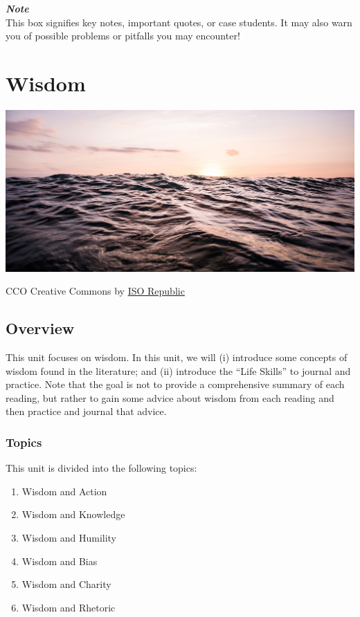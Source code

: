 \documentclass[
]{book}
\providecommand{\tightlist}{%
  \setlength{\itemsep}{0pt}\setlength{\parskip}{0pt}}
\begin{document}
\begin{feedback}
\textbf{\emph{Note}}\\
This box signifies key notes, important quotes, or case students. It may
also warn you of possible problems or pitfalls you may encounter!
\end{feedback}

\hypertarget{wisdom}{%
\chapter{Wisdom}\label{wisdom}}

\includegraphics{assets/u1/Unit_1_Overview.png}

CCO Creative Commons by \href{https://isorepublic.com/photo/sun-reflecting-on-waves/}{ISO Republic}

\hypertarget{overview}{%
\section*{Overview}\label{overview}}

This unit focuses on wisdom. In this unit, we will (i) introduce some concepts of wisdom found in the literature; and (ii) introduce the ``Life Skills'' to journal and practice. Note that the goal is not to provide a comprehensive summary of each reading, but rather to gain some advice about wisdom from each reading and then practice and journal that advice.

\hypertarget{topics}{%
\subsection*{Topics}\label{topics}}

This unit is divided into the following topics:

\begin{enumerate}
\def\labelenumi{\arabic{enumi}.}
\tightlist
\item
  Wisdom and Action\\
\item
  Wisdom and Knowledge\\
\item
  Wisdom and Humility\\
\item
  Wisdom and Bias\\
\item
  Wisdom and Charity\\
\item
  Wisdom and Rhetoric
\end{enumerate}
\end{document}
